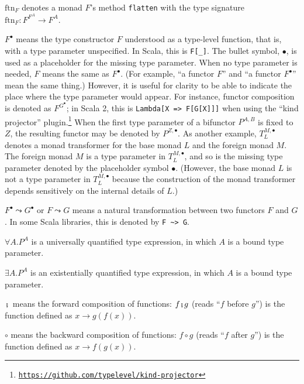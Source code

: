$\text{ftn}_{F}$ denotes a monad $F$\textsf{'}s method \lstinline!flatten!
with the type signature $\text{ftn}_{F}:F^{F^{A}}\rightarrow F^{A}$.

$F^{\bullet}$ means the type constructor $F$ understood as a type-level
function, \textemdash{} that is, with a type parameter unspecified.
In Scala, this is \lstinline!F[_]!. The bullet symbol, $\bullet$,
is used as a placeholder for the missing type parameter. When no type
parameter is needed, $F$ means the same as $F^{\bullet}$. (For example,
\textsf{``}a functor $F$\textsf{''} and \textsf{``}a functor $F^{\bullet}$\textsf{''} mean the same
thing.) However, it is useful for clarity to be able to indicate the
place where the type parameter would appear. For instance, functor
composition is denoted as $F^{G^{\bullet}}$; in Scala 2, this is
\texttt{}\lstinline!Lambda[X => F[G[X]]]! when using the \textsf{``}kind
projector\textsf{''} plugin.\footnote{\texttt{\href{https://github.com/typelevel/kind-projector}{https://github.com/typelevel/kind-projector}}}
When the first type parameter of a bifunctor $P^{A,B}$ is fixed to
$Z$, the resulting functor may be denoted by $P^{Z,\bullet}$. As
another example, $T_{L}^{M,\bullet}$ denotes a monad transformer
for the base monad $L$ and the foreign monad $M$. The foreign monad
$M$ is a type parameter in $T_{L}^{M,\bullet}$, and so is the missing
type parameter denoted by the placeholder symbol $\bullet$. (However,
the base monad $L$ is not a type parameter in $T_{L}^{M,\bullet}$
because the construction of the monad transformer depends sensitively
on the internal details of $L$.)

$F^{\bullet}\leadsto G^{\bullet}$ or $F\leadsto G$ means a natural
transformation between two functors $F$ and $G$. In some Scala libraries,
this is denoted by \lstinline!F ~> G!.

$\forall A.P^{A}$ is a universally quantified type expression, in
which $A$ is a bound type parameter.

$\exists A.P^{A}$ is an existentially quantified type expression,
in which $A$ is a bound type parameter.

$\bef$ means the forward composition
of functions: $f\bef g$ (reads \textsf{``}$f$ before $g$\textsf{''}) is the function
defined as $x\rightarrow g(f(x))$.

$\circ$ means the backward composition
of functions: $f\circ g$ (reads \textsf{``}$f$ after $g$\textsf{''}) is the function
defined as $x\rightarrow f(g(x))$.

